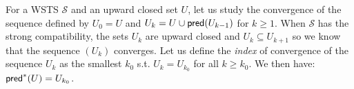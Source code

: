 

For a WSTS $\mathscr{S}$ and an upward closed set $U$, let us study the convergence of the sequence defined by $U_0=U$ and $U_k= U \cup \textsf{pred}(U_{k-1})$ for $k \geq 1$. When $\mathscr{S}$ has the strong compatibility, the sets $U_k$ are upward closed and $U_k \subseteq U_{k+1}$ so we know that the sequence $(U_k)$ converges. Let us define the \emph{index} of convergence of the sequence $U_k$ as the smallest $k_0$ s.t. $U_k = U_{k_0}$ for all $k \geq k_0$. We then have:  $\textsf{pred}^*(U) = U_{k_0}$. \\


